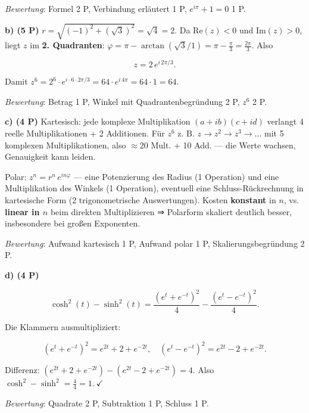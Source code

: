 \documentclass[11pt, a4paper]{article}
\begin{document}
\textit{Bewertung}: Formel 2 P, Verbindung erläutert 1 P, $e^{i\pi}+1=0$ 1 P.


\textbf{b) (5 P)} $r = \sqrt{(-1)^2+(\sqrt{3})^2} = \sqrt{4} = 2$. Da $\text{Re}(z)<0$ und $\text{Im}(z)>0$, liegt $z$ im \textbf{2. Quadranten}: $\varphi = \pi - \arctan(\sqrt{3}/1) = \pi - \tfrac{\pi}{3} = \tfrac{2\pi}{3}$. Also

\[
z = 2\,e^{i\,2\pi/3}.
\]

Damit $z^6 = 2^6\cdot e^{i\cdot 6\cdot 2\pi/3} = 64\cdot e^{i\,4\pi} = 64\cdot 1 = 64$.

\textit{Bewertung}: Betrag 1 P, Winkel mit Quadrantenbegründung 2 P, $z^6$ 2 P.


\textbf{c) (4 P)} Kartesisch: jede komplexe Multiplikation $(a+ib)(c+id)$ verlangt 4 reelle Multiplikationen + 2 Additionen. Für $z^6$ z. B. $z\to z^2\to z^3 \to \dots$ mit 5 komplexen Multiplikationen, also $\approx 20$ Mult. + 10 Add. — die Werte wachsen, Genauigkeit kann leiden.

Polar: $z^n = r^n\,e^{i n\varphi}$ — eine Potenzierung des Radius (1 Operation) und eine Multiplikation des Winkels (1 Operation), eventuell eine Schluss-Rückrechnung in kartesische Form (2 trigonometrische Auswertungen). Kosten \textbf{konstant} in $n$, vs. \textbf{linear in $n$} beim direkten Multiplizieren ⇒ Polarform skaliert deutlich besser, insbesondere bei großen Exponenten.

\textit{Bewertung}: Aufwand kartesisch 1 P, Aufwand polar 1 P, Skalierungsbegründung 2 P.


\textbf{d) (4 P)}

\[
\cosh^2(t)-\sinh^2(t) = \frac{(e^t+e^{-t})^2}{4} - \frac{(e^t-e^{-t})^2}{4}.
\]

Die Klammern ausmultipliziert:

\[
(e^t+e^{-t})^2 = e^{2t}+2+e^{-2t},\quad (e^t-e^{-t})^2 = e^{2t}-2+e^{-2t}.
\]

Differenz: $(e^{2t}+2+e^{-2t}) - (e^{2t}-2+e^{-2t}) = 4$. Also $\cosh^2-\sinh^2 = \tfrac{4}{4} = 1.\ \checkmark$

\textit{Bewertung}: Quadrate 2 P, Subtraktion 1 P, Schluss 1 P.





\end{document}
